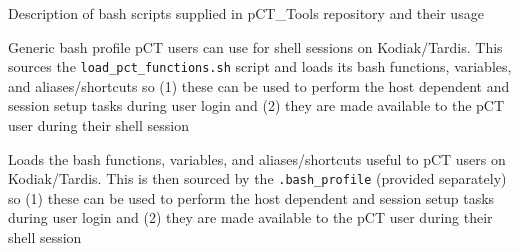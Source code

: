 \begin{tcbenclosure}[type=script, title=bash scripts,]
\begin{tcbContentsBox}
\tcbsectionheaderfont Description of bash scripts supplied in pCT\_Tools repository and their usage
\end{tcbContentsBox}
\begin{tcbcode}[type=script, title=.bash\_profile]%
    \tcbfunctiondesc
    {Generic bash profile pCT users can use for shell sessions on Kodiak/Tardis.  This sources the \texttt{load\_pct\_functions.sh} script and loads its bash functions, variables, and aliases/shortcuts so (1) these can be used to perform the host dependent and session setup tasks during user login and (2) they are made available to the pCT user during their shell session}\\[-3.0em]
\end{tcbcode}
\begin{tcbcode}[type=script, title=load\_pct\_functions.sh]%
    \tcbfunctiondesc
    {Loads the bash functions, variables, and aliases/shortcuts useful to pCT users on Kodiak/Tardis.  This is then sourced by the \texttt{.bash\_profile} (provided separately) so (1) these can be used to perform the host dependent and session setup tasks during user login and (2) they are made available to the pCT user during their shell session}\\[-3.0em]

\end{tcbcode}
\end{tcbenclosure}
